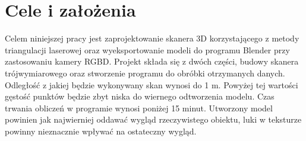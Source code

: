 \section{Cele i założenia}
Celem niniejszej pracy jest zaprojektowanie skanera 3D korzystającego z metody triangulacji laserowej  oraz wyeksportowanie modeli do programu Blender przy zastosowaniu kamery RGBD. Projekt składa się z dwóch części, budowy skanera trójwymiarowego oraz stworzenie programu do obróbki otrzymanych danych. Odległość z jakiej będzie wykonywany skan wynosi do 1 m. Powyżej tej wartości gęstość punktów będzie zbyt niska do wiernego odtworzenia modelu. Czas trwania obliczeń w programie wynosi poniżej 15 minut. Utworzony model powinien jak najwierniej oddawać wygląd rzeczywistego obiektu, luki w teksturze powinny nieznacznie wpływać na ostateczny wygląd.
